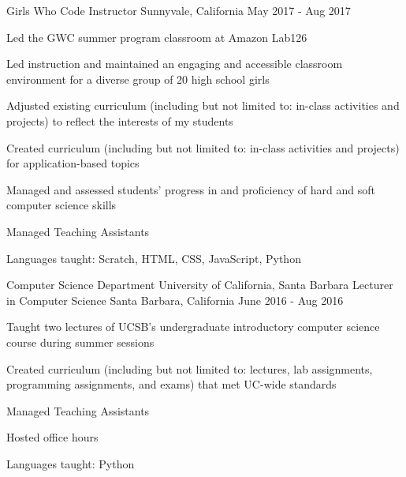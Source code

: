 \begin{cventries}
  \cventry
{Girls Who Code}
    {Instructor}
    {Sunnyvale, California}
    {May 2017 - Aug 2017}
    {
      \begin{cvitems}
	\item {Led the GWC summer program classroom at Amazon Lab126}\\
	\begin{cvitems}
        \item Led instruction and maintained an engaging and accessible classroom environment for a diverse group of 20 high school girls
         \item Adjusted existing curriculum (including but not limited to: in-class activities and projects) to reflect the interests of my students
         \item Created curriculum (including but not limited to: in-class activities and projects) for application-based topics
	\item Managed and assessed students’ progress in and proficiency of hard and soft computer science skills
	\item Managed Teaching Assistants
	\end{cvitems}
	\vspace{2mm}
	\item Languages taught: Scratch, HTML, CSS, JavaScript, Python
      \end{cvitems}
    }

  \cventry
{Computer Science Department \newline University of California, Santa Barbara}
    {Lecturer in Computer Science}
    {Santa Barbara, California}
    {June 2016 - Aug 2016}
    {
      \begin{cvitems}
	\item {Taught two lectures of UCSB's undergraduate introductory computer science course during summer sessions}\\
	\begin{cvitems}
         \item Created curriculum (including but not limited to: lectures, lab assignments, programming assignments, and exams) that met UC-wide standards
	\item Managed Teaching Assistants
	\item Hosted office hours 
	\end{cvitems}
	\vspace{2mm}
	\item Languages taught: Python
      \end{cvitems}
    }


\end{cventries}
